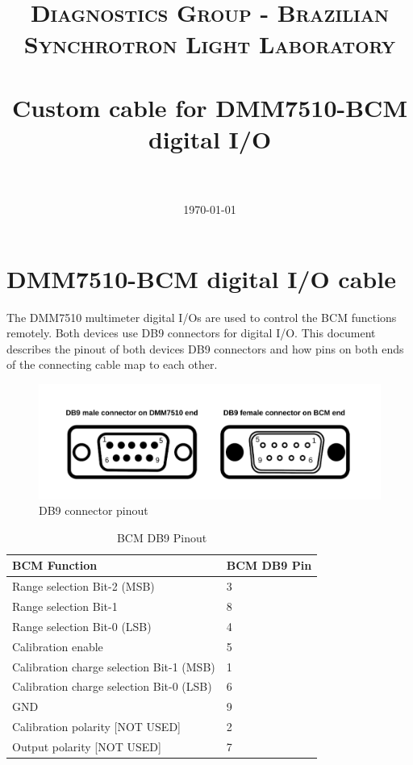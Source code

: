 \documentclass[paper=a4, fontsize=11pt]{scrartcl}
\title{
		\usefont{OT1}{bch}{b}{n}
		\normalfont \normalsize \textsc{Diagnostics Group - Brazilian Synchrotron Light Laboratory} \\ [25pt]
		\horrule{0.5pt} \\[0.4cm]
		\huge Custom cable for DMM7510-BCM digital I/O \\
		\horrule{2pt} \\[0.5cm]
}
\author{
		\normalfont 								\normalsize
        \today
}
\date{}
\numberwithin{figure}{section}			%
\numberwithin{table}{section}			%
\begin{document}
\maketitle
\section{DMM7510-BCM digital I/O cable}
The DMM7510 multimeter digital I/Os are used to control the BCM functions remotely. Both devices use DB9 connectors for digital I/O. This document describes the pinout of both devices DB9 connectors and how pins on both ends of the connecting cable map to each other.

\begin{figure}[!h]
	\caption{DB9 connector pinout}
	\label{fig:db9-pins}
	\centering
	\includegraphics[width=1.0\textwidth]{bcm_db9_connectors}
\end{figure}
\FloatBarrier

\begin{table}
	\center
	\caption{BCM DB9 Pinout}
	\begin{tabular}{m{8cm} m{2cm}}
		\bfseries BCM Function & \bfseries BCM DB9 Pin \\ \hline
		Range selection Bit-2 (MSB) & 3 \\ \hline
		Range selection Bit-1 & 8 \\ \hline
		Range selection Bit-0 (LSB) & 4 \\ \hline
		Calibration enable & 5 \\ \hline
		Calibration charge selection Bit-1 (MSB) & 1 \\ \hline
		Calibration charge selection Bit-0 (LSB) & 6 \\ \hline
		GND & 9 \\ \hline
		Calibration polarity [NOT USED] & 2 \\ \hline
		Output polarity [NOT USED] & 7 \\ \hline
	\end{tabular}
\end{table}
\end{document}
